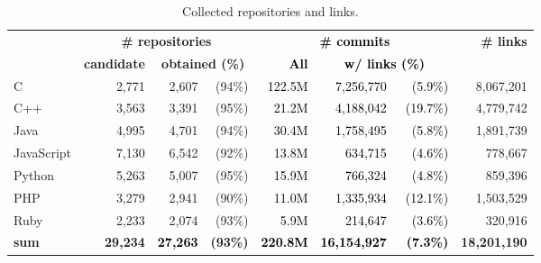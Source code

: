 \documentclass[smallextended]{svjour3}       %
\newcommand{\fix}[1]{\textcolor{black}{#1}}
\begin{document}
\begin{table}[t]
\centering
\caption{Collected repositories and links.}
\label{tab:coll}    
\begin{tabular}{l@{}rr@{}rrr@{}rr}
\toprule

 & \multicolumn{3}{c}{\textbf{\# repositories}} & \multicolumn{3}{c}{\fix{\textbf{\# commits}}} &  \textbf{\# links} \\
 &  \textbf{candidate} &  \multicolumn{2}{c}{\textbf{obtained (\%)}} & \fix{\textbf{All}} & \multicolumn{2}{c}{\fix{\textbf{w/ links  (\%)}}} & \\
\midrule

C           & 2,771 & 2,607 & (94\%) & \fix{122.5M} & \fix{7,256,770} & \fix{ (5.9\%)}  & 8,067,201 \\
C++         & 3,563 & 3,391 & (95\%) & \fix{21.2M}  & \fix{4,188,042} & \fix{(19.7\%)}  & 4,779,742 \\
Java        & 4,995 & 4,701 & (94\%) & \fix{30.4M}  & \fix{1,758,495} & \fix{(5.8\%) }  & 1,891,739 \\
JavaScript  & 7,130 & 6,542 & (92\%) & \fix{13.8M}  & \fix{  634,715} & \fix{(4.6\%) }  &   778,667 \\
Python      & 5,263 & 5,007 & (95\%) & \fix{15.9M}  & \fix{  766,324} & \fix{(4.8\%) }  &   859,396 \\
PHP         & 3,279 & 2,941 & (90\%) & \fix{11.0M}  & \fix{1,335,934} & \fix{~(12.1\%)} & 1,503,529 \\
Ruby        & 2,233 & 2,074 & (93\%) &  \fix{5.9M}  & \fix{  214,647} & \fix{(3.6\%) }  &   320,916 \\
\midrule
\textbf{sum}& \textbf{29,234}& \fix{\textbf{27,263}}& \textbf{(93\%)}& \fix{\textbf{220.8M}} & \fix{\textbf{16,154,927}} & \fix{\textbf{(7.3\%)}} &  \textbf{18,201,190} \\

\bottomrule
\end{tabular}
\end{table}

\end{document}
